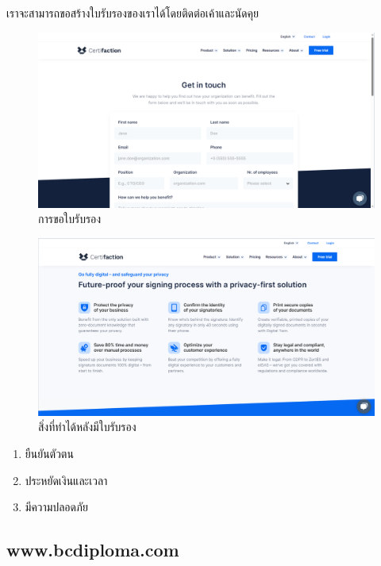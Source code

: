 เราจะสามารถขอสร้างใบรับรองของเราได้โดยติดต่อเค้าและนัดคุย

\enskip \enskip \enskip 
\graphicspath{ {./images/} }
\begin{figure}[htbp]
  \centering 
  \includegraphics[scale=0.3]{certifi_2.png}
  \caption[การขอใบรับรอง]{การขอใบรับรอง}
  \label{certifi_2}
\end{figure}


\enskip \enskip \enskip 
\graphicspath{ {./images/} }
\begin{figure}[htbp]
  \centering 
  \includegraphics[scale=0.3]{certifi_3.png}
  \caption[สิ่งที่ทำได้หลังมีใบรับรอง]{สิ่งที่ทำได้หลังมีใบรับรอง}
  \label{certifi_3}
\end{figure}

\begin{enumerate}
  \item ยืนยันตัวตน
  \item ประหยัดเงินและเวลา
  \item มีความปลอดภัย
\end{enumerate}

\subsection{www.bcdiploma.com~\cite{bcdiploma}}

